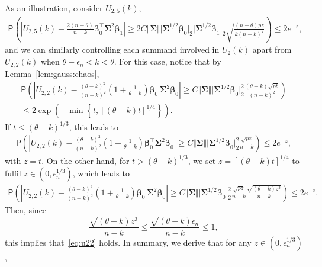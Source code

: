 \documentclass[11pt, a4paper]{article}
\newcommand{\eps}{\epsilon}
\renewcommand{\l}{\left}
\renewcommand{\r}{\right}
\newcommand{\cp}{\theta}
\newcommand{\p}{\mathsf{P}}
\theoremstyle{definition}
\theoremstyle{definition}
\theoremstyle{definition}
\theoremstyle{definition}
\theoremstyle{definition}
\theoremstyle{remark}
\theoremstyle{definition}
\theoremstyle{definition}
\theoremstyle{definition}
\begin{document}
As an illustration, consider $U_{2, 5}(k)$,
\begin{align*}
\p\l( \l\vert U_{2, 5}(k) - \frac{2 (n - \cp)}{n - k} \bm\beta_0^\top \bm\Sigma^2 \bm\beta_1 \r\vert \ge {2}C \Vert \bm\Sigma \Vert \vert \bm\Sigma^{1/2} \bm\beta_0 \vert_2 \vert \bm\Sigma^{1/2} \bm\beta_1 \vert_2 \sqrt{\frac{(n - \cp) pz}{k (n - k)^2}} \r) \le 2e^{-z},
\end{align*}
and we can similarly controlling each summand involved in $U_2(k)$ apart from $U_{2, 2}(k)$ when $\cp - \eps_n < k < \cp$. 
For this case, notice that by Lemma~\ref{lem:gauss:chaos},
\begin{align*}
\p\l( \l\vert U_{2, 2}(k) - \frac{(\cp - k)^2}{(n - k)^2} \l(1 + \frac{1}{\cp - k}\r) \bm\beta_0^\top \bm\Sigma^2 \bm\beta_0 \r\vert \ge  C \Vert \bm\Sigma \Vert \vert \bm\Sigma^{1/2} \bm\beta_0 \vert_2^2 \frac{(\cp - k) \sqrt{pt}}{(n - k)^2} \r) \\
\le 2\exp\l( -\min\l\{t, [(\cp - k)t]^{1/4} \r\} \r).
\end{align*}
If $t \le (\cp - k)^{1/3}$, this leads to
\begin{align}
\p\l( \l\vert U_{2, 2}(k) - \frac{(\cp - k)^2}{(n - k)^2} \l(1 + \frac{1}{\cp - k}\r) \bm\beta_0^\top \bm\Sigma^2 \bm\beta_0 \r\vert \ge  C \Vert \bm\Sigma \Vert \vert \bm\Sigma^{1/2} \bm\beta_0 \vert_2^2 \frac{ \sqrt{pz}}{n - k} \r) \le 2e^{-z},
\label{eq:u22}
\end{align}
with $z = t$.
On the other hand, for $t > (\cp - k)^{1/3}$, we set $z = [(\cp - k)t]^{1/4}$ to fulfil $z \in (0, \eps_n^{1/3})$, which leads to
\begin{align*}
\p\l( \l\vert U_{2, 2}(k) - \frac{(\cp - k)^2}{(n - k)^2} \l(1 + \frac{1}{\cp - k}\r) \bm\beta_0^\top \bm\Sigma^2 \bm\beta_0 \r\vert \ge  C \Vert \bm\Sigma \Vert \vert \bm\Sigma^{1/2} \bm\beta_0 \vert_2^2 \frac{\sqrt{pz}}{n-k}\frac{\sqrt{(\cp - k)z^3}}{n - k} \r) \le 2e^{-z}.
\end{align*}
Then, since  
\[
\frac{\sqrt{(\cp - k)z^3}}{n - k} \le \frac{\sqrt{(\cp - k)\eps_n}}{n - k} \le 1,
\]
this implies that~\eqref{eq:u22} holds.
In summary, we derive that for any $z \in (0, \eps_n^{1/3})$,
\end{document}
